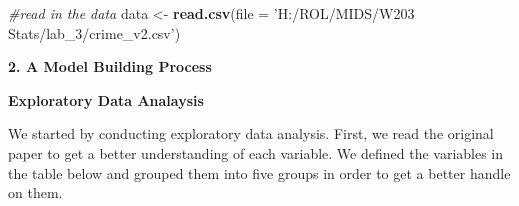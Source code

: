 \documentclass[
]{article}
\newenvironment{Shaded}{\begin{snugshade}}{\end{snugshade}}
\newcommand{\CommentTok}[1]{\textcolor[rgb]{0.56,0.35,0.01}{\textit{#1}}}
\newcommand{\DataTypeTok}[1]{\textcolor[rgb]{0.13,0.29,0.53}{#1}}
\newcommand{\KeywordTok}[1]{\textcolor[rgb]{0.13,0.29,0.53}{\textbf{#1}}}
\newcommand{\NormalTok}[1]{#1}
\newcommand{\StringTok}[1]{\textcolor[rgb]{0.31,0.60,0.02}{#1}}
\begin{document}
\begin{Shaded}
\begin{Highlighting}[]
\CommentTok{#read in the data}
\NormalTok{data <-}\StringTok{ }\KeywordTok{read.csv}\NormalTok{(}\DataTypeTok{file =} \StringTok{'H:/ROL/MIDS/W203 Stats/lab_3/crime_v2.csv'}\NormalTok{)}
\end{Highlighting}
\end{Shaded}

\textbf{2. A Model Building Process}

\textbf{Exploratory Data Analaysis}

We started by conducting exploratory data analysis. First, we read the
original paper to get a better understanding of each variable. We
defined the variables in the table below and grouped them into five
groups in order to get a better handle on them.
\end{document}
